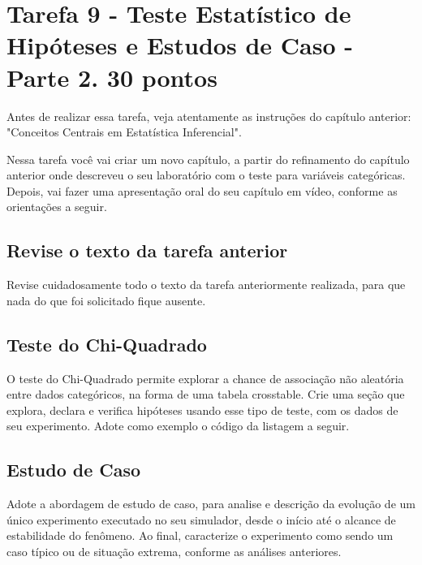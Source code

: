 \chapter{Tarefa 9 - Teste Estatístico de Hipóteses e Estudos de Caso - Parte 2. 30 pontos\label{tarefa:teste:hipotese2:R}}

Antes de realizar essa tarefa, veja atentamente as instruções do capítulo anterior: "Conceitos Centrais em Estatística Inferencial".

Nessa tarefa você vai criar um novo capítulo, a partir do refinamento do capítulo anterior onde descreveu o seu laboratório com o teste para variáveis categóricas. Depois, vai fazer uma apresentação oral do seu capítulo em vídeo, conforme as orientações a seguir.

\section{Revise o texto da tarefa anterior}

Revise cuidadosamente todo o texto da tarefa anteriormente realizada, para que nada do que foi solicitado fique ausente.

\section{Teste do Chi-Quadrado} 

O teste do Chi-Quadrado permite explorar a chance de associação não aleatória entre dados categóricos, na forma de uma tabela crosstable. Crie uma seção que explora, declara e verifica hipóteses usando esse tipo de teste, com os dados de seu experimento. Adote como exemplo o código da listagem a seguir.

 
 
\section{Estudo de Caso}

Adote a abordagem de estudo de caso, para analise e descrição da evolução de um único experimento executado no seu simulador, desde o início até o alcance de estabilidade do fenômeno. Ao final, caracterize o experimento como sendo um caso típico ou de situação extrema, conforme as análises anteriores.

